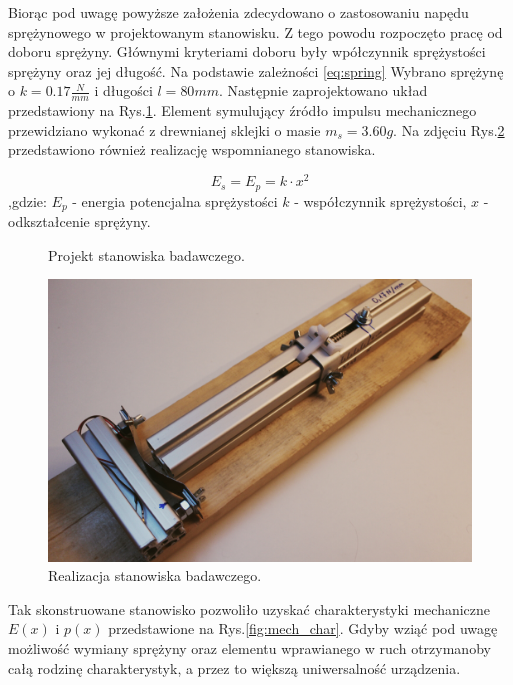 \indent %
Biorąc pod uwagę powyższe założenia zdecydowano o zastosowaniu napędu sprężynowego w projektowanym stanowisku. Z tego powodu rozpoczęto pracę od doboru sprężyny. Głównymi kryteriami doboru były wpółczynnik sprężystości sprężyny oraz jej długość. Na podstawie zależności \ref{eq:spring} Wybrano sprężynę o $k=0.17\frac{N}{mm}$ i długości $l=80mm$. Następnie zaprojektowano
układ przedstawiony na Rys.\ref{fig:test_stand}. Element symulujący źródło impulsu mechanicznego przewidziano wykonać z drewnianej sklejki o masie $m_s = 3.60g$. Na zdjęciu Rys.\ref{fig:test_stand_photo} przedstawiono również realizację wspomnianego stanowiska.

\begin{equation}
E_s = E_p = k \cdot x^2
\label{eq:spring}
\end{equation}
,gdzie: $E_p$ - energia potencjalna sprężystości $k$ - współczynnik sprężystości, $x$ - odkształcenie sprężyny.


\begin{figure}[htbp]
\centering
{}%
\caption{Projekt stanowiska badawczego.}
\label{fig:test_stand}
\end{figure}

\begin{figure}[htbp]
\centering
\includegraphics[width=\linewidth]{pictures/lab_stand.jpg}
\caption{Realizacja stanowiska badawczego.}
\label{fig:test_stand_photo}
\end{figure}

Tak skonstruowane stanowisko pozwoliło uzyskać charakterystyki mechaniczne $E(x)$ i $p(x)$ przedstawione na Rys.\ref{fig:mech_char}. Gdyby wziąć pod uwagę możliwość wymiany sprężyny oraz elementu wprawianego w ruch otrzymanoby całą rodzinę charakterystyk, a przez to większą uniwersalność urządzenia.

